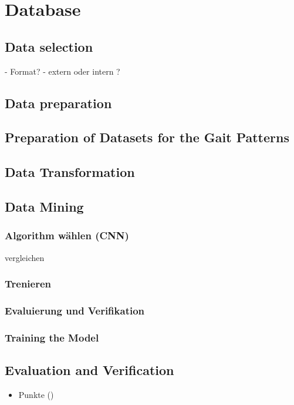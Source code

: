 %
%


\chapter{Database}
\section{Data selection}
- Format?
- extern oder intern ?
\section{Data preparation}
\section{Preparation of Datasets for the Gait Patterns}
\section{Data Transformation}
\section{Data Mining}
\subsection {Algorithm wählen (CNN)}
vergleichen  
\subsection {Trenieren }
\subsection {Evaluierung und Verifikation}
\subsection{Training the Model}
\section{Evaluation and Verification}





\begin{itemize}
	\item Punkte ()

\end{itemize}


